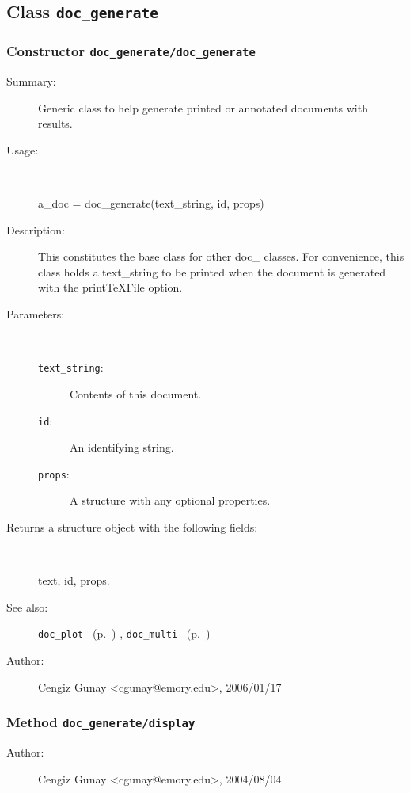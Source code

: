 \subsection{Class \texttt{doc\_generate}}%
%
\label{ref_doc_generate}%
\hypertarget{ref_doc_generate}{}%
\subsubsection[Constructor \texttt{doc\_generate}]{Constructor \texttt{doc\_generate/doc\_generate}}%
%
\label{ref_doc_generate__doc_generate}%
\hypertarget{ref_doc_generate__doc_generate}{}%
\begin{description}
\item[Summary:]Generic class to help generate printed or annotated documents with results.
%
\item[Usage:]~%
\begin{lyxcode}%
a\_doc = doc\_generate(text\_string, id, props)
%
\end{lyxcode}%
%
\item[Description:]%
This constitutes the base class for other doc\_ classes. For convenience,
 this class holds a text\_string to be printed when the document is generated
 with the printTeXFile option.
\item[Parameters:]~
\begin{description}%
\item[\texttt{text\_string}:]
 Contents of this document.
\item[\texttt{id}:]
 An identifying string.
\item[\texttt{props}:]
 A structure with any optional properties.
\end{description}%
%
\item[Returns a structure object with the following fields:
]~

	text, id, props.
%
%
\item[See also:]%
\hyperlink{ref_doc_plot}{\texttt{doc\_plot}}%
\ (p.~\pageref{ref_doc_plot})%
%
, \hyperlink{ref_doc_multi}{\texttt{doc\_multi}}%
\ (p.~\pageref{ref_doc_multi})%
%
%
\item[Author:]%
Cengiz Gunay <cgunay@emory.edu>, 2006/01/17
%
\end{description}
\methodline%
\subsubsection[Method \texttt{display}]{Method \texttt{doc\_generate/display}}%
%
\label{ref_doc_generate__display}%
\hypertarget{ref_doc_generate__display}{}%
\begin{description}
%
%
%
%
%
%
%
\item[Author:]%
Cengiz Gunay <cgunay@emory.edu>, 2004/08/04
%
\end{description}
\methodline%
